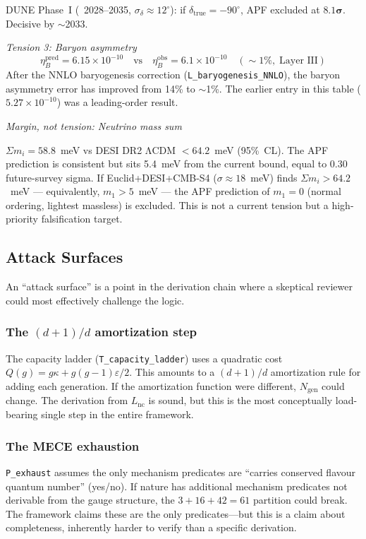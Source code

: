 \documentclass[11pt]{article}
\begin{document}
DUNE Phase~I (~2028--2035, $\sigma_\delta \approx 12^\circ$): if $\delta_{\mathrm{true}} = -90^\circ$, APF excluded at $\mathbf{8.1\sigma}$.  Decisive by $\sim$2033.

\textit{Tension 3: Baryon asymmetry}
\[
\eta_B^{\mathrm{pred}} = 6.15\times 10^{-10} \quad\text{vs}\quad \eta_B^{\mathrm{obs}} = 6.1\times 10^{-10} \quad(\sim 1\%,\;\text{Layer III})
\]
After the NNLO baryogenesis correction (\texttt{L\_baryogenesis\_NNLO}), the baryon asymmetry error has improved from 14\% to $\sim$1\%.  The earlier entry in this table ($5.27\times10^{-10}$) was a leading-order result.

\textit{Margin, not tension: Neutrino mass sum}

$\Sigma m_i = 58.8$~meV vs DESI DR2 ΛCDM $< 64.2$~meV (95\%~CL).  The APF prediction is consistent but sits 5.4~meV from the current bound, equal to 0.30 future-survey sigma.  If Euclid+DESI+CMB-S4 ($\sigma \approx 18$~meV) finds $\Sigma m_i > 64.2$~meV --- equivalently, $m_1 > 5$~meV --- the APF prediction of $m_1 = 0$ (normal ordering, lightest massless) is excluded.  This is not a current tension but a high-priority falsification target.


\subsection{Attack Surfaces}

An ``attack surface'' is a point in the derivation chain where a skeptical reviewer could most effectively challenge the logic.

\subsubsection{The \texorpdfstring{$(d+1)/d$}{(d+1)/d} amortization step}

The capacity ladder (\texttt{T\_capacity\_ladder}) uses a quadratic cost $Q(g) = g\kappa + g(g-1)\varepsilon/2$.  This amounts to a $(d+1)/d$ amortization rule for adding each generation.  If the amortization function were different, $N_{\mathrm{gen}}$ could change.  The derivation from $L_{\mathrm{nc}}$ is sound, but this is the most conceptually load-bearing single step in the entire framework.

\subsubsection{The MECE exhaustion}

\texttt{P\_exhaust} assumes the only mechanism predicates are ``carries conserved flavour quantum number'' (yes/no).  If nature has additional mechanism predicates not derivable from the gauge structure, the $3 + 16 + 42 = 61$ partition could break.  The framework claims these are the only predicates---but this is a claim about completeness, inherently harder to verify than a specific derivation.
\end{document}
